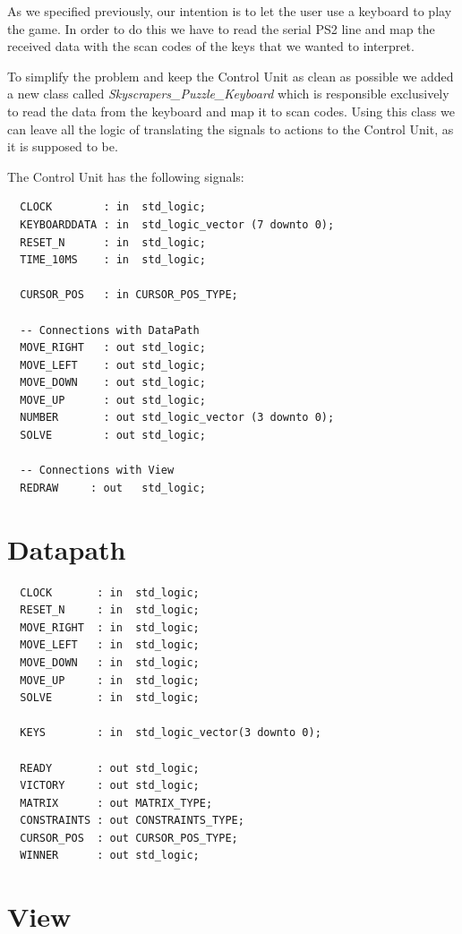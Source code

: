 \documentclass[12pt]{report}
\begin{document}
As we specified previously, our intention is to let the user use
a keyboard to play the game. In order to do this we have to read the
serial PS2 line and map the received data with the scan codes of the
keys that we wanted to interpret.

To simplify the problem and keep the Control Unit as clean as possible
we added a new class called \textit{Skyscrapers\_Puzzle\_Keyboard} which is
responsible exclusively to read the data from the keyboard and map it to
scan codes. Using this class we can leave all the logic of translating
the signals to actions to the Control Unit, as it is supposed to be.

The Control Unit has the following signals:

\begin{verbatim}
  CLOCK        : in  std_logic;
  KEYBOARDDATA : in  std_logic_vector (7 downto 0);
  RESET_N      : in  std_logic;
  TIME_10MS    : in  std_logic;

  CURSOR_POS   : in CURSOR_POS_TYPE;

  -- Connections with DataPath
  MOVE_RIGHT   : out std_logic;
  MOVE_LEFT    : out std_logic;
  MOVE_DOWN    : out std_logic;
  MOVE_UP      : out std_logic;
  NUMBER       : out std_logic_vector (3 downto 0);
  SOLVE        : out std_logic;

  -- Connections with View
  REDRAW     : out   std_logic;
\end{verbatim}


\section*{Datapath}

\begin{verbatim}
  CLOCK       : in  std_logic;
  RESET_N     : in  std_logic;
  MOVE_RIGHT  : in  std_logic;
  MOVE_LEFT   : in  std_logic;
  MOVE_DOWN   : in  std_logic;
  MOVE_UP     : in  std_logic;
  SOLVE       : in  std_logic;

  KEYS        : in  std_logic_vector(3 downto 0);

  READY       : out std_logic;
  VICTORY     : out std_logic;
  MATRIX      : out MATRIX_TYPE;
  CONSTRAINTS : out CONSTRAINTS_TYPE;
  CURSOR_POS  : out CURSOR_POS_TYPE;
  WINNER      : out std_logic;
\end{verbatim}

\section*{View}
\end{document}
